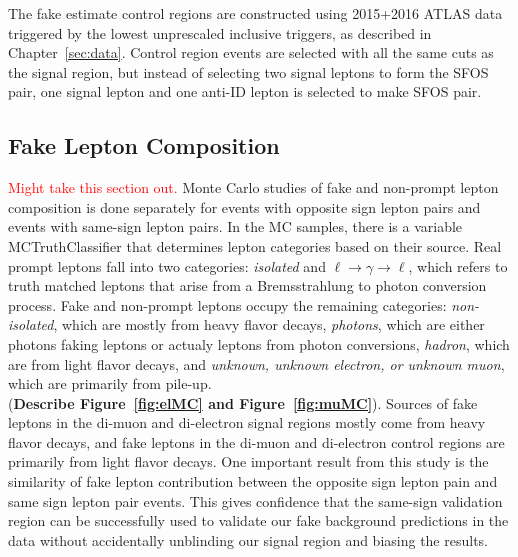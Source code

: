 The fake estimate control regions are constructed using 2015+2016 ATLAS data triggered by the lowest unprescaled inclusive \met{} triggers, as described in Chapter~\ref{sec:data}.  Control region events are selected with all the same cuts as the signal region, but instead of selecting two signal leptons to form the SFOS pair, one signal lepton and one anti-ID lepton is selected to make SFOS pair. 
  \FloatBarrier
  \iffalse
  \subsection{Fake Lepton Composition}
  \textcolor{red}{Might take this section out.}
 Monte Carlo studies of fake and non-prompt lepton composition is done separately for events with opposite sign lepton pairs and events with same-sign lepton pairs.  In the MC samples, there is a variable MCTruthClassifier that determines lepton categories based on their source.  Real prompt leptons fall into two categories: \textit{isolated} and $\ell\rightarrow \gamma \rightarrow \ell$, which refers to truth matched leptons that arise from a Bremsstrahlung to photon conversion process. Fake and non-prompt leptons occupy the remaining categories: \textit{non-isolated}, which are mostly from heavy flavor decays, \textit{photons}, which are either photons faking leptons or actualy leptons from photon conversions, \textit{hadron}, which are from light flavor decays, and \textit{unknown, unknown electron, or unknown muon}, which are primarily from pile-up.\\
 
(\textbf{Describe Figure~\ref{fig:elMC} and Figure~\ref{fig:muMC}}). Sources of fake leptons in the di-muon and di-electron signal regions mostly come from heavy flavor decays, and fake leptons in the di-muon and di-electron control regions are primarily from light flavor decays.  One important result from this study is the similarity of fake lepton contribution between the opposite sign lepton pain and same sign lepton pair events.  This gives confidence that the same-sign validation region can be successfully used to validate our fake background predictions in the data without accidentally unblinding our signal region and biasing the results.  

